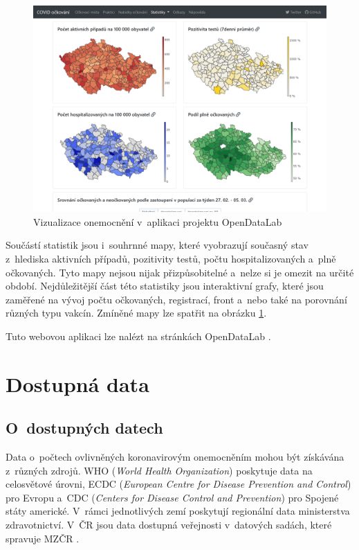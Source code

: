 \begin{figure}[h]
	\centering
	\includegraphics[width=1\textwidth]{Pictures/opendatalab-screen.png}
	\caption{Vizualizace onemocnění v~aplikaci projektu OpenDataLab \cite{soucasnystav-covid-statistika}}
	\label{fig:OpenDataLabScreen}
\end{figure}

Součástí statistik jsou i~souhrnné mapy, které vyobrazují současný stav z~hlediska aktivních případů, pozitivity testů, počtu hospitalizovaných a~plně očkovaných. Tyto mapy nejsou nijak přizpůsobitelné a~nelze si je omezit na určité období. Nejdůležitější část této statistiky jsou interaktivní grafy, které jsou zaměřené na vývoj počtu očkovaných, registrací, front a~nebo také na porovnání různých typu vakcín. Zmíněné mapy lze spatřit na obrázku \ref{fig:OpenDataLabScreen}.

Tuto webovou aplikaci lze nalézt na stránkách OpenDataLab \cite{opendatalab-ockovani}.

\section{Dostupná data}

\subsection{O~dostupných datech}
Data o~počtech ovlivněných koronavirovým onemocněním mohou být získávána z~různých zdrojů. WHO (\emph{World Health Organization}) poskytuje data na celosvětové úrovni, ECDC (\emph{European Centre for Disease Prevention and Control}) pro Evropu a~CDC (\emph{Centers for Disease Control and Prevention}) pro Spojené státy americké. V~rámci jednotlivých zemí poskytují regionální data ministerstva zdravotnictví. V~ČR jsou data dostupná veřejnosti v~datových sadách, které spravuje MZČR \cite{bednarkova-covid}.


